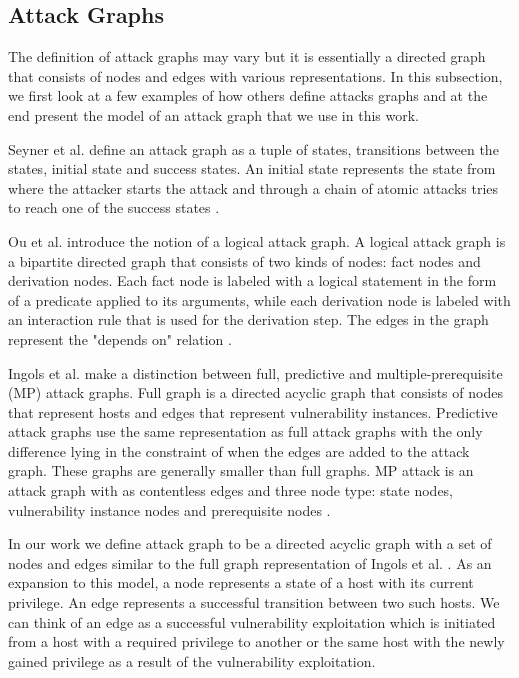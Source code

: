 \subsection{Attack Graphs}
\label{chap:attack_graphs}

The definition of attack graphs may vary but it is essentially a directed graph that consists of nodes and edges with various representations. In this subsection, we first look at a few examples of how others define attacks graphs and at the end present the model of an attack graph that we use in this work.

Seyner et al. define an attack graph as a tuple of states, transitions between the states, initial state and success states. An initial state represents the state from where the attacker starts the attack and through a chain of atomic attacks tries to reach one of the success states \cite{sheyner2002automated}.

Ou et al. introduce the notion of a logical attack graph. A logical attack graph is a bipartite directed graph that consists of two kinds of nodes: fact nodes and derivation nodes. Each fact node is labeled with a logical statement in the form of a predicate applied to its arguments, while each derivation node is labeled with an interaction rule that is used for the derivation step. The edges in the graph represent the "depends on" relation \cite{ou2006scalable}.

Ingols et al. make a distinction between full, predictive and multiple-prerequisite (MP) attack graphs. Full graph is a directed acyclic graph that consists of nodes that represent hosts and edges that represent vulnerability instances. Predictive attack graphs use the same representation as full attack graphs with the only difference lying in the constraint of when the edges are added to the attack graph. These graphs are generally smaller than full graphs. MP attack is an attack graph with as contentless edges and three node type: state nodes, vulnerability instance nodes and prerequisite nodes \cite{ingols2006practical}.

In our work we define attack graph to be a directed acyclic graph with a set of nodes and edges similar to the full graph representation of Ingols et al. \cite{ingols2006practical}. As an expansion to this model, a node represents a state of a host with its current privilege. An edge represents a successful transition between two such hosts. We can think of an edge as a successful vulnerability exploitation which is initiated from a host with a required privilege to another or the same host with the newly gained privilege as a result of the vulnerability exploitation.
